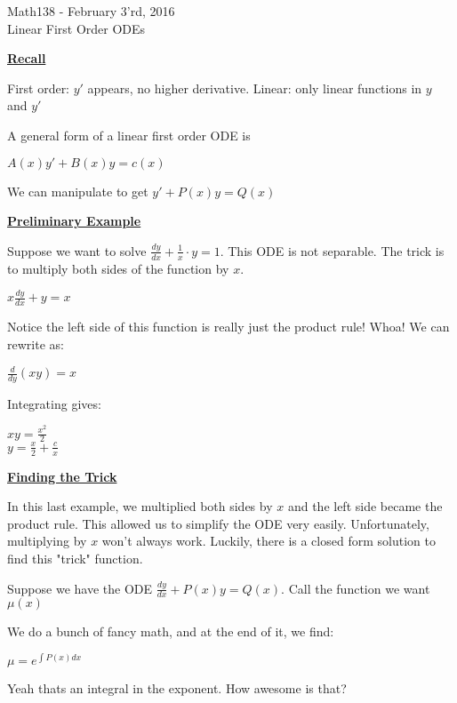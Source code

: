 \documentclass{letter}
\newcommand{\0}[1]{\begin{bmatrix}#1\end{bmatrix}}
\newcommand{\h}[1]{\underline{\textbf{#1}}}
\begin{document}
	\begin{center}
		\LARGE Math138 - February 3'rd, 2016\\
		\large Linear First Order ODEs
	\end{center}
	\vspace{0.25 in}
	
	\h{Recall}
	
	First order: $y'$ appears, no higher derivative. Linear: only linear functions in $y$ and $y'$
	
	A general form of a linear first order ODE is
	
	$A(x) y' + B(x)y = c(x)$
	
	We can manipulate to get $y' + P(x)y = Q(x)$
	
	\h{Preliminary Example}
	
	Suppose we want to solve $\frac{dy}{dx} + \frac{1}{x} \cdot y = 1$. This ODE is not separable. The trick is to multiply both sides of the function by $x$.
	
	$x \frac{dy}{dx} + y = x$
	
	Notice the left side of this function is really just the product rule! Whoa! We can rewrite as:
	
	$\frac{d}{dy}\left(xy\right) = x$
	
	Integrating gives:
	
	$xy = \frac{x^2}{2}$\\
	$y = \frac{x}{2} + \frac{c}{x}$
	
	\h{Finding the Trick}
	
	In this last example, we multiplied both sides by $x$ and the left side became the product rule. This allowed us to simplify the ODE very easily. Unfortunately, multiplying by $x$ won't always work. Luckily, there is a closed form solution to find this "trick" function.
	
	Suppose we have the ODE $\displaystyle \frac{dy}{dx} + P(x)y = Q(x)$. Call the function we want $\mu(x)$
	
	We do a bunch of fancy math, and at the end of it, we find:
	
	$\displaystyle \mu = e^{\int P(x) dx}$
	
	Yeah thats an integral in the exponent. How awesome is that?
\end{document}
